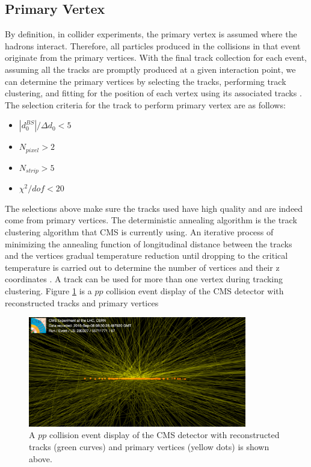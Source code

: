 \subsection{Primary Vertex}

By definition, in collider experiments, the primary vertex is assumed where the hadrons interact. Therefore, all particles produced in the collisions in that event originate from the primary vertices. With the final track collection for each event, assuming all the tracks are promptly produced at a given interaction point, we can determine the primary vertices by selecting the tracks, performing track clustering, and fitting for the position of each vertex using its associated tracks \cite{CMSTrackComp}. The selection criteria for the track to perform primary vertex are as follows:

\begin{itemize}
\item $|d_0^{BS}|/ \Delta d_0 < 5$
\item $N_{pixel} > 2$
\item $N_{strip} > 5$
\item $\chi^2/dof < 20$
\end{itemize}



The selections above make sure the tracks used have high quality and are indeed come from primary vertices. The deterministic annealing algorithm \cite{DAAlgo} is the track clustering algorithm that CMS is currently using. An iterative process of minimizing the annealing function of longitudinal distance between the tracks and the vertices gradual temperature reduction until dropping to the critical temperature is carried out to determine the number of vertices and their z coordinates \cite{CMSTrackComp}. A track can be used for more than one vertex during tracking clustering. Figure \ref{CMSEvtDisplay} is a $pp$ collision event display of the CMS detector with reconstructed tracks and primary vertices 

\begin{figure}[hbtp]
\begin{center}
\includegraphics[width=0.85\textwidth]{Figures/Chapter4/CMSEvtDisplay.png}
\caption{A $pp$ collision event display of the CMS detector with reconstructed tracks (green curves) and primary vertices (yellow dots) is shown above.}
\label{CMSEvtDisplay}
\end{center}
\end{figure} 

